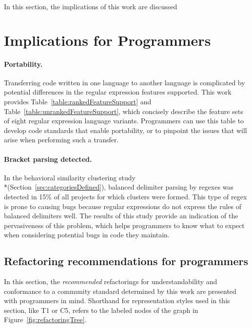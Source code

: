 In this section, the implications of this work are discussed

\section{Implications for Programmers}

\paragraph{Portability.} Transferring code written in one language to another language is complicated by potential differences in the regular expression features supported.  This work provides Table~\ref{table:rankedFeatureSupport} and Table~\ref{table:unrankedFeatureSupport}, which concisely describe the feature sets of eight regular expression language variants.  Programmers can use this table to develop code standards that enable portability, or to pinpoint the issues that will arise when performing such a transfer.

\paragraph{Bracket parsing detected.} In the behavioral similarity clustering study \\*(Section~\ref{sec:categoriesDefined}), balanced delimiter parsing by regexes was detected in 15\% of all projects for which clusters were formed.  This type of regex is prone to causing bugs because regular expressions do not express the rules of balanced delimiters well.  The results of this study provide an indication of the pervasiveness of this problem, which helps programmers to know what to expect when considering potential bugs in code they maintain.

\subsection{Refactoring recommendations for programmers}
In this section, the \emph{recommended} refactorings for understandability and conformance to a community standard determined by this work are presented with programmers in mind.  Shorthand for representation styles used in this section, like T1 or C5, refers to the labeled nodes of the graph in Figure~\ref{fig:refactoringTree}.

